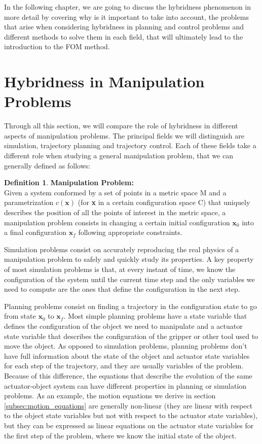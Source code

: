\documentclass[12,twoside]{TFG-GM}
\theoremstyle{definition}
\newtheorem{definition}[theorem]{Definition}
\theoremstyle{remark}
\begin{document}
In the following chapter, we are going to discuss the hybridness phenomenon in more detail by covering why is it important to take into account, the problems that arise when considering hybridness in planning and control problems and different methods to solve them in each field, that will ultimately lead to the introduction to the FOM method.

\section{Hybridness in Manipulation Problems}

Through all this section, we will compare the role of hybridness in different aspects of manipulation problems. The principal fields we will distinguish are  simulation, trajectory planning and trajectory control. Each of these fields take a different role when studying a general manipulation problem, that we can generally defined as follows:
\begin{definition} \textbf{Manipulation Problem:}\\

Given a system conformed by a set of points in a metric space M and a parametrization $c(\textbf{x})$ (for \textbf{x} in a certain configuration space C) that uniquely describes the position of all the points of interest in the metric space, a manipulation problem consists in changing a certain initial configuration $\textbf{x}_0$ into a final configuration \textbf{$\textbf{x}_f$} following appropriate constraints.
\end{definition}

Simulation problems consist on accurately reproducing the real physics of a manipulation problem to safely and quickly study its properties. A key property of most simulation problems is that, at every instant of time, we know the configuration of the system until the current time step and the only variables we need to compute are the ones that define the configuration in the next step.

Planning problems consist on finding a trajectory in the configuration state to go from state $\textbf{x}_0$ to $\textbf{x}_f$. Most simple planning problems have a state variable that defines the configuration of the object we need to manipulate and a actuator state variable that describes the configuration of the gripper or other tool used to move the object. As opposed to simulation problems, planning problems don't have full information about the state of the object and actuator state variables for each step of the trajectory, and they are usually variables of the problem. Because of this difference, the equations that describe the evolution of the same actuator-object system can have different properties in planning or simulation problems. As an example, the motion equations we derive in section \ref{subsec:motion_equations} are generally non-linear (they are linear with respect to the object state variables but not with respect to the actuator state variables), but they can be expressed as linear equations on the actuator state variables for the first step of the problem, where we know the initial state of the object.
\end{document}
